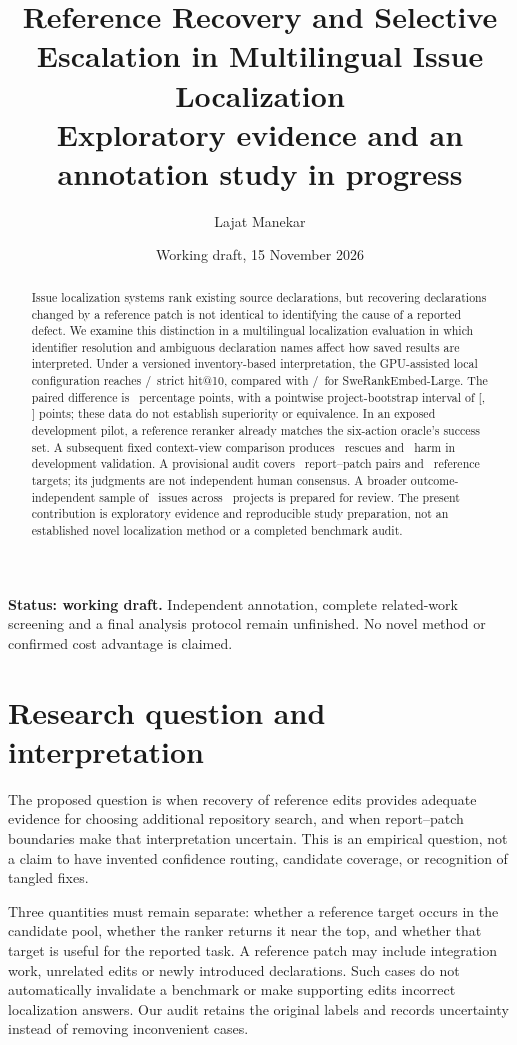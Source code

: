 \documentclass[11pt]{article}
\title{Reference Recovery and Selective Escalation in Multilingual Issue Localization\\\large Exploratory evidence and an annotation study in progress}
\author{Lajat Manekar}
\date{Working draft, 15 November 2026}
\begin{document}
\maketitle
\noindent\textbf{Status: working draft.} Independent annotation, complete related-work
screening and a final analysis protocol remain unfinished. No novel method or confirmed
cost advantage is claimed.

\begin{abstract}
Issue localization systems rank existing source declarations, but recovering declarations
changed by a reference patch is not identical to identifying the cause of a reported defect.
We examine this distinction in a multilingual localization evaluation in which identifier
resolution and ambiguous declaration names affect how saved results are interpreted. Under a versioned inventory-based interpretation, the GPU-assisted local
configuration reaches \GPUHits/\FullIssues\ strict hit@10, compared with
\LargeHits/\FullIssues\ for SweRankEmbed-Large. The paired difference is
\DeltaPoints\ percentage points, with a pointwise project-bootstrap interval of
[\CILow, \CIHigh] points; these data do not establish superiority or equivalence.
In an exposed development pilot, a reference reranker already matches the six-action
oracle's success set. A subsequent fixed context-view comparison produces
\ValidationRescues\ rescues and \ValidationHarms\ harm in development validation.
A provisional audit covers \AuditIssues\ report--patch pairs and \AuditTargets\ reference
targets; its judgments are not independent human consensus. A broader outcome-independent
sample of \BroaderIssues\ issues across \BroaderProjects\ projects is prepared for review.
The present contribution is exploratory evidence and reproducible study
preparation, not an established novel localization method or a completed benchmark audit.
\end{abstract}

\section{Research question and interpretation}
The proposed question is when recovery of reference edits provides adequate evidence for
choosing additional repository search, and when report--patch boundaries make that
interpretation uncertain. This is an empirical question, not a claim to have invented
confidence routing, candidate coverage, or recognition of tangled fixes.

Three quantities must remain separate: whether a reference target occurs in the candidate
pool, whether the ranker returns it near the top, and whether that target is useful for the
reported task. A reference patch may include integration work, unrelated edits or newly
introduced declarations. Such cases do not automatically invalidate a benchmark or make
supporting edits incorrect localization answers. Our audit retains the original labels and
records uncertainty instead of removing inconvenient cases.
\end{document}
